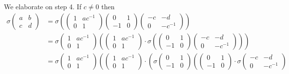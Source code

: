 We elaborate on step 4. If $c\neq 0$ then
\begin{align}\label{fullsigma}
	\sigma\left(\begin{matrix}a & b\\c & d\end{matrix}\right)
	&=
	\sigma\left(
		\left(\begin{matrix}1 & ac^{-1}\\0 & 1\end{matrix}\right)
		\left(\begin{matrix}0 & 1\\-1 & 0\end{matrix}\right)
		\left(\begin{matrix}-c & -d\\0 & -c^{-1}\end{matrix}\right)
	\right) \nonumber \\
	&=
	\sigma\left(\begin{matrix}1 & ac^{-1}\\0 & 1\end{matrix}\right)\left(
		\left(\begin{matrix}1 & ac^{-1}\\0 & 1\end{matrix}\right)\cdot
	\sigma\left(
		\left(\begin{matrix}0 & 1\\-1 & 0\end{matrix}\right)
		\left(\begin{matrix}-c & -d\\0 & -c^{-1}\end{matrix}\right)
	\right)
	\right)\nonumber \\
	&=
	\sigma\left(\begin{matrix}1 & ac^{-1}\\0 & 1\end{matrix}\right)\left(
		\left(\begin{matrix}1 & ac^{-1}\\0 & 1\end{matrix}\right)\cdot
	\left(\sigma\left(\begin{matrix}0 & 1\\-1 & 0\end{matrix}\right)\left(
		\left(\begin{matrix}0 & 1\\-1 & 0\end{matrix}\right)\cdot
		\sigma\left(\begin{matrix}-c & -d\\0 & -c^{-1}\end{matrix}\right)

\end{align}

